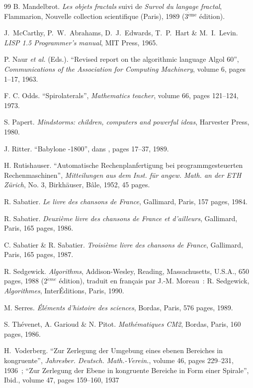 \begin{thebibliography}{99}
 B. Mandelbrot.
{\em Les objets fractals} {\footnotesize suivi de} {\em Survol du langage
fractal}, Flammarion, Nouvelle collection scientifique (Paris), 1989
(3$^{\mathrm{\grave{e}me}}$ édition).

 J.~McCarthy, P.~W.~Abrahams, D.~J.~Edwards, T.~P.~Hart
\& M.~I.~Levin.
{\em LISP 1.5 Programmer's manual}, 
MIT Press, 1965.

 P. Naur {\em et al.}  (Eds.).
``Revised report on the algorithmic language Algol 60'', 
{\em Communications of the Association for Computing Machinery}, 
volume 6, pages 1--17, 1963.

 F. C. Odds.
``Spirolaterals'', {\em Mathematics teacher}, volume 66, pages 121--124, 1973.

 S. Papert.
{\em Mindstorms: children, computers and powerful ideas}, Harvester Press, 
1980.

 J. Ritter.
``Babylone -1800'', \rm dans \cite{serres1}, pages 17--37, 1989.

 H. Rutishauser.
``Automatische Rechenplanfertigung bei programmgesteuerten
Rechenmaschinen'', {\em Mitteilungen aus dem Inst. für angew. Math. an der ETH 
Zürich}, No. 3, Birkhäuser, Bâle, 1952, 45 pages.

 R. Sabatier.
{\em Le livre des chansons de France}, Gallimard, Paris, 157 pages, 1984.

 R. Sabatier.
{\em Deuxième livre des chansons de France et d'ailleurs}, 
Gallimard, Paris, 165 pages, 1986.

 C. Sabatier \& R. Sabatier.
{\em Troisième livre des chansons de France}, 
Gallimard, Paris, 165 pages, 1987.

 R. Sedgewick.
{\em Algorithms}, Addison-Wesley, Reading, Massachusetts, U.S.A., 
650 pages, 1988 (2$^{\grave{e}me}$ édition), {\footnotesize traduit en français par
J.-M. Moreau~:} R. Sedgewick, {\em Algorithmes}, InterÉditions, Paris, 1990.

 M. Serres.
{\em Éléments d'histoire des sciences},  Bordas, Paris, 576 pages, 1989.

 S. Thévenet, A. Garioud \& N. Pitot.
{\em Mathématiques CM2},  Bordas, Paris, 160 pages, 1986.

 H.~Voderberg.
``Zur Zerlegung der Umgebung eines ebenen Bereiches in kongruente'', 
{\em Jahresber. Deutsch. Math.-Verein.}, 
volume 46, pages 229--231, 1936~;
``Zur Zerlegung der Ebene in kongruente Bereiche in Form einer Spirale'', 
{Ibid.}, 
volume 47, pages 159--160, 1937


\end{thebibliography}
